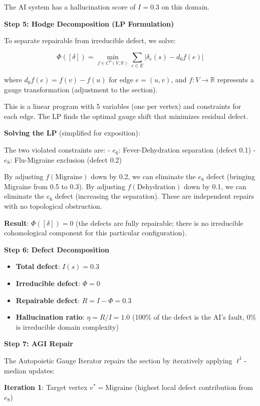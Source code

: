 \documentclass[
]{article}
\providecommand{\tightlist}{%
  \setlength{\itemsep}{0pt}\setlength{\parskip}{0pt}}
\begin{document}
The AI system has a hallucination score of \(I = 0.3\) on this domain.

\textbf{Step 5: Hodge Decomposition (LP Formulation)}

To separate repairable from irreducible defect, we solve:

\[\Phi([\delta]) = \min_{f \in C^0(V, \mathbb{R})} \sum_{e \in E} |\delta_e(s) - d_0 f(e)|\]

where \(d_0 f(e) = f(v) - f(u)\) for edge \(e = (u, v)\), and
\(f: V \to \mathbb{R}\) represents a gauge transformation (adjustment to
the section).

This is a linear program with 5 variables (one per vertex) and
constraints for each edge. The LP finds the optimal gauge shift that
minimizes residual defect.

\textbf{Solving the LP} (simplified for exposition):

The two violated constraints are: - \(e_6\): Fever-Dehydration
separation (defect 0.1) - \(e_8\): Flu-Migraine exclusion (defect 0.2)

By adjusting \(f(\text{Migraine})\) down by 0.2, we can eliminate the
\(e_8\) defect (bringing Migraine from 0.5 to 0.3). By adjusting
\(f(\text{Dehydration})\) down by 0.1, we can eliminate the \(e_6\)
defect (increasing the separation). These are independent repairs with
no topological obstruction.

\textbf{Result}: \(\Phi([\delta]) = 0\) (the defects are fully
repairable; there is no irreducible cohomological component for this
particular configuration).

\textbf{Step 6: Defect Decomposition}

\begin{itemize}
\tightlist
\item
  \textbf{Total defect}: \(I(s) = 0.3\)
\item
  \textbf{Irreducible defect}: \(\Phi = 0\)
\item
  \textbf{Repairable defect}: \(R = I - \Phi = 0.3\)
\item
  \textbf{Hallucination ratio}: \(\eta = R / I = 1.0\) (100\% of the
  defect is the AI's fault, 0\% is irreducible domain complexity)
\end{itemize}

\textbf{Step 7: AGI Repair}

The Autopoietic Gauge Iterator repairs the section by iteratively
applying \(\ell^1\)-median updates:

\textbf{Iteration 1}: Target vertex \(v^* = \text{Migraine}\) (highest
local defect contribution from \(e_8\))
\end{document}

